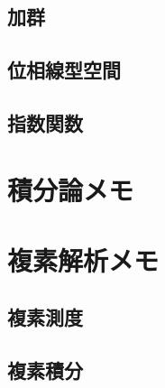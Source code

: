 \documentclass[a4j,10.5pt,oneside,openany]{jsbook}
\theoremstyle{mystyle}
\begin{document}
	\section{加群}
		
		
	\section{位相線型空間}
		
		
		
		
		
		
	\section{指数関数}
		
		
		
		
		
		
		
		
		

\chapter{積分論メモ}
	
	
	
	
	
	
	
	
	
	
	

\chapter{複素解析メモ}
	\section{複素測度}
		
		
		
	\section{複素積分}
		
		
		
		
		
		
		
		
		
		
		
\end{document}
